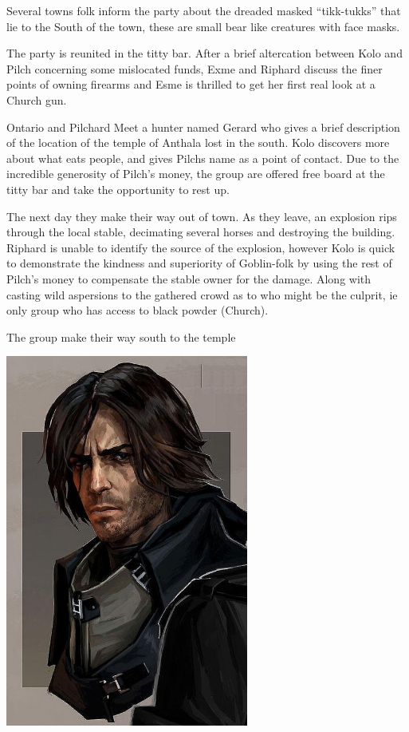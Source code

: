 \documentclass[letterpaper,10pt,twoside,twocolumn,openany]{book}
\begin{document}
Several towns folk inform the party about the dreaded masked “tikk-tukks” that lie to the South of the town, these are small bear like creatures with face masks.

The party is reunited in the titty bar. After a brief altercation between Kolo and Pilch concerning some mislocated funds, Exme and Riphard discuss the finer points of owning firearms and Esme is thrilled to get her first real look at a Church gun.

Ontario and Pilchard Meet a hunter named Gerard who gives a brief description of the location of the temple of Anthala lost in the south. Kolo discovers more about what eats people, and gives Pilchs name as a point of contact. Due to the incredible generosity of Pilch’s money, the group are offered free board at the titty bar and take the opportunity to rest up.

The next day they make their way out of town. As they leave, an explosion rips through the local stable, decimating several horses and destroying the building. Riphard is unable to identify the source of the explosion, however Kolo is quick to demonstrate the kindness and superiority of Goblin-folk by using the rest of Pilch’s money to compensate the stable owner for the damage. Along with casting wild aspersions to the gathered crowd as to who might be the culprit, ie only group who has access to black powder (Church).

The group make their way south to the temple

\begin{center}
\includegraphics[width=80mm]{./img/pilch1.jpg}
\begin{figure}[h]
\end{figure}
\end{center}
\end{document}
